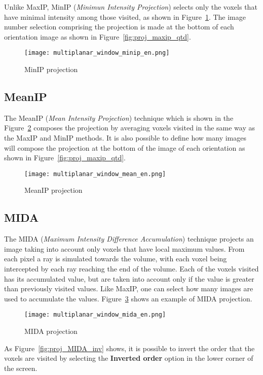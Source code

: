 Unlike MaxIP, MinIP (\textit{Minimun Intensity Projection}) selects only the voxels that have minimal intensity among those visited, as shown in Figure~\ref{fig:proj_minIP}. The image number selection comprising the projection is made at the bottom of each orientation image as shown in Figure~\ref{fig:proj_maxip_qtd}.

\begin{figure}[!h]
\centering
\texttt{[image: multiplanar\_window\_minip\_en.png]}
\caption{MinIP projection}
\label{fig:proj_minIP}
\end{figure}

\subsection{MeanIP}
The MeanIP (\textit{Mean Intensity Projection}) technique which is shown in the Figure~\ref{fig:proj_meanIP} composes the projection by averaging voxels visited in the same way as the MaxIP and MinIP methods. It is also possible to define how many images will compose the projection at the bottom of the image of each orientation as shown in Figure~\ref{fig:proj_maxip_qtd}.

\begin{figure}[!h]
\centering
\texttt{[image: multiplanar\_window\_mean\_en.png]}
\caption{MeanIP projection}
\label{fig:proj_meanIP}
\end{figure}

\subsection{MIDA}
\label{sub:mida}
The MIDA (\textit{Maximum Intensity Difference Accumulation}) technique projects an image taking into account only voxels that have local maximum values. From each pixel a ray is simulated towards the volume, with each voxel being intercepted by each ray reaching the end of the volume. Each of the voxels visited has its accumulated value, but are taken into account only if the value is greater than previously visited values. Like MaxIP, one can select how many images are used to accumulate the values. Figure~\ref{fig:proj_MIDA} shows an example of MIDA projection.

\begin{figure}[!h]
\centering
\texttt{[image: multiplanar\_window\_mida\_en.png]}
\caption{MIDA projection}
\label{fig:proj_MIDA}
\end{figure}

As Figure~\ref{fig:proj_MIDA_inv} shows, it is possible to invert the order that the voxels are visited by selecting the \textbf{Inverted order} option in the lower corner of the screen.

